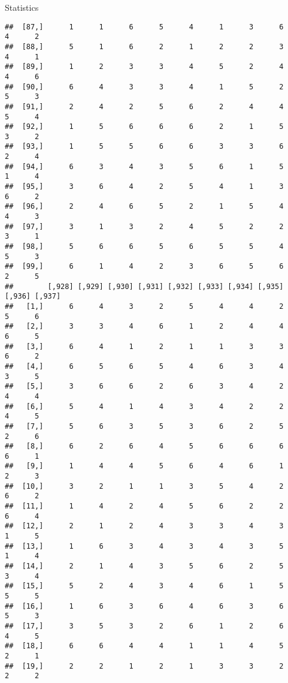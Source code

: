\documentclass[
  ignorenonframetext,
]{beamer}
\begin{document}
\begin{frame}[fragile]{Statistics}
\begin{verbatim}
##  [87,]      1      1      6      5      4      1      3      6      4      2
##  [88,]      5      1      6      2      1      2      2      3      4      1
##  [89,]      1      2      3      3      4      5      2      4      4      6
##  [90,]      6      4      3      3      4      1      5      2      5      3
##  [91,]      2      4      2      5      6      2      4      4      5      4
##  [92,]      1      5      6      6      6      2      1      5      3      2
##  [93,]      1      5      5      6      6      3      3      6      2      4
##  [94,]      6      3      4      3      5      6      1      5      1      4
##  [95,]      3      6      4      2      5      4      1      3      6      2
##  [96,]      2      4      6      5      2      1      5      4      4      3
##  [97,]      3      1      3      2      4      5      2      2      3      1
##  [98,]      5      6      6      5      6      5      5      4      5      3
##  [99,]      6      1      4      2      3      6      5      6      2      5
##        [,928] [,929] [,930] [,931] [,932] [,933] [,934] [,935] [,936] [,937]
##   [1,]      6      4      3      2      5      4      4      2      5      6
##   [2,]      3      3      4      6      1      2      4      4      6      5
##   [3,]      6      4      1      2      1      1      3      3      6      2
##   [4,]      6      5      6      5      4      6      3      4      3      5
##   [5,]      3      6      6      2      6      3      4      2      4      4
##   [6,]      5      4      1      4      3      4      2      2      4      5
##   [7,]      5      6      3      5      3      6      2      5      2      6
##   [8,]      6      2      6      4      5      6      6      6      6      1
##   [9,]      1      4      4      5      6      4      6      1      2      3
##  [10,]      3      2      1      1      3      5      4      2      6      2
##  [11,]      1      4      2      4      5      6      2      2      6      4
##  [12,]      2      1      2      4      3      3      4      3      1      5
##  [13,]      1      6      3      4      3      4      3      5      1      4
##  [14,]      2      1      4      3      5      6      2      5      3      4
##  [15,]      5      2      4      3      4      6      1      5      5      5
##  [16,]      1      6      3      6      4      6      3      6      5      3
##  [17,]      3      5      3      2      6      1      2      6      4      5
##  [18,]      6      6      4      4      1      1      4      5      2      1
##  [19,]      2      2      1      2      1      3      3      2      2      2

\end{verbatim}
\end{frame}
\end{document}

